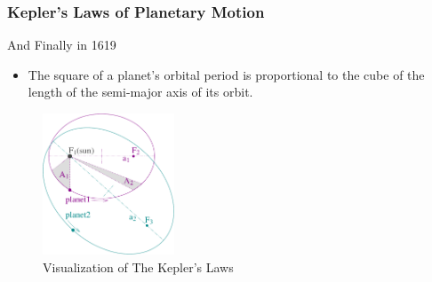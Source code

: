     
    

    
    
    
    
      \begin{frame}
        \frametitle{Kepler's Laws of Planetary Motion}
        And Finally in 1619
        \pause
        \begin{itemize}[<+->]
          \item The square of a planet's orbital period is proportional to the cube of the length of the semi-major axis of its orbit.
        \end{itemize}
          \begin{figure}
            \centering
            \includegraphics[width=0.35\textwidth]{./data/image/kepler_laws_diagram.pdf}
          \caption{Visualization of The Kepler's Laws}
          \label{image:kepler_law_planetary}
          \end{figure}
        \end{frame}
    
